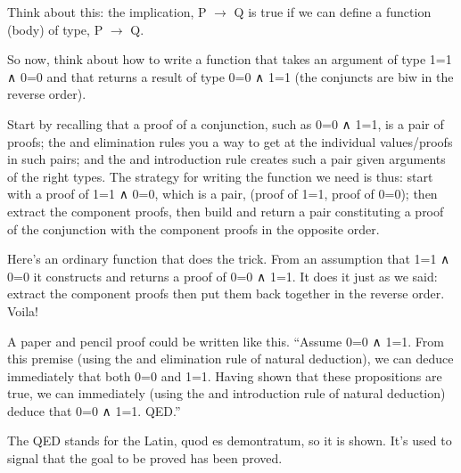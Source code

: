 \documentclass[letterpaper,10pt,english]{sphinxmanual}
\begin{document}
Think about this: the implication, P \(\rightarrow\) Q is true if we can define a
function (body) of type, P \(\rightarrow\) Q.

So now, think about how to write a function that takes an argument of
type 1=1 ∧ 0=0 and that returns a result of type 0=0 ∧ 1=1 (the
conjuncts are biw in the reverse order).

Start by recalling that a proof of a conjunction, such as 0=0 ∧ 1=1,
is a pair of proofs; the and elimination rules you a way to get at the
individual values/proofs in such pairs; and the and introduction rule
creates such a pair given arguments of the right types. The strategy
for writing the function we need is thus: start with a proof of 1=1 ∧
0=0, which is a pair, (proof of 1=1, proof of 0=0); then extract the
component proofs, then build and return a pair constituting a proof of
the conjunction with the component proofs in the opposite order.

Here’s an ordinary function that does the trick.  From an assumption
that 1=1 ∧ 0=0 it constructs and returns a proof of 0=0 ∧ 1=1. It does
it just as we said: extract the component proofs then put them back
together in the reverse order. Voila!

\begin{sphinxVerbatim}[commandchars=\\\{\}]
        
         
         
\end{sphinxVerbatim}

A paper and pencil proof could be written like this.  “Assume 0=0 ∧
1=1. From this premise (using the and elimination rule of natural
deduction), we can deduce immediately that both 0=0 and 1=1. Having
shown that these propositions are true, we can immediately (using the
and introduction rule of natural deduction) deduce that 0=0 ∧
1=1. QED.”

The QED stands for the Latin, quod es demontratum, so it is
shown. It’s used to signal that the goal to be proved has been proved.
\end{document}
